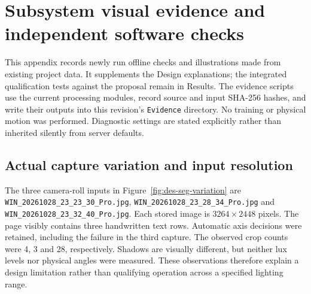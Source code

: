 \section{Subsystem visual evidence and independent software checks}
\label{app:des-visual-tests}
This appendix records newly run offline checks and illustrations made from existing project data. It supplements the Design explanations; the integrated qualification tests against the proposal remain in Results. The evidence scripts use the current processing modules, record source and input SHA-256 hashes, and write their outputs into this revision's \texttt{Evidence} directory. No training or physical motion was performed. Diagnostic settings are stated explicitly rather than inherited silently from server defaults.

\subsection{Actual capture variation and input resolution}
The three camera-roll inputs in Figure~\ref{fig:des-seg-variation} are \texttt{WIN\_20261028\_23\_23\_30\_Pro.jpg}, \texttt{WIN\_20261028\_23\_28\_34\_Pro.jpg} and \texttt{WIN\_20261028\_23\_32\_40\_Pro.jpg}. Each stored image is $3264\times2448$ pixels. The page visibly contains three handwritten text rows. Automatic axis decisions were retained, including the failure in the third capture. The observed crop counts were 4, 3 and 28, respectively. Shadows are visually different, but neither lux levels nor physical angles were measured. These observations therefore explain a design limitation rather than qualifying operation across a specified lighting range.

